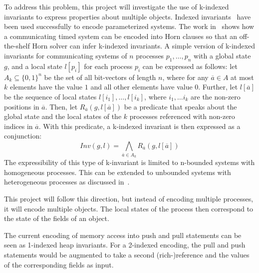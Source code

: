 To address this problem, this project will investigate the use of
k-indexed invariants to express properties about multiple objects.
Indexed invariants~\cite{Sanchez:2012:IGP:2414936.2414950} have been
used successfully to encode parameterized systems. The work 
in~\cite{DBLP:journals/corr/HojjatRSY14} shows how a communicating
timed system can be encoded into Horn clauses so that an 
off-the-shelf Horn solver can infer k-indexed invariants. 
A simple version of k-indexed invariants for communicating systems 
of $n$ processes $p_1,\ldots,p_n$ with a
global state $g$, and a local state $l[p_i]$ for each process 
$p_i$ can be expressed as follows: let $A_k\subseteq \{0,1\}^n$ be
the set of all bit-vectors of length $n$, where for 
any $\overline{a}\in A$ at most $k$ elements have the value $1$ and all 
other elements have value $0$. Further, let $l[\overline{a}]$ be the
sequence of local states $l[i_1], \ldots, l[i_k]$, where 
$i_1, \ldots i_k$ are the non-zero positions in $\overline{a}$.
Then, let $R_{\overline{a}}(g,l[\overline{a}])$ be a predicate that
speaks about the global state and the local states of the $k$ 
processes referenced with non-zero indices in $\overline{a}$. With
this predicate, a k-indexed invariant is then expressed as a
conjunction:
\[
Inv(g,l)= 
\bigwedge_{\overline{a}\in A_k} R_{\overline{a}}(g,l[\overline{a}])
\]
The expressibility of this type of k-invariant is limited to 
n-bounded systems with homogeneous processes. This can be extended
to unbounded systems with heterogeneous processes as discussed in~\cite{DBLP:journals/corr/HojjatRSY14}.

This project will follow this direction, but instead of encoding
multiple processes, it will encode multiple objects. The local 
states of the process then correspond to the state of the fields 
of an object. 

The current encoding of memory access into push and pull statements
can be seen as 1-indexed heap invariants. For a 2-indexed encoding,
the pull and push statements would be augmented to take a second
(rich-)reference and the values of the corresponding fields as input.

